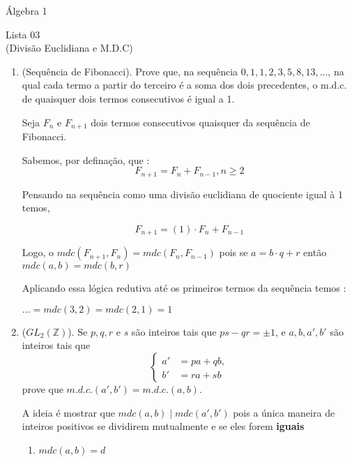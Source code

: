 \documentclass[a4paper,12pt]{article}
\begin{document}
\begin{center}
    Álgebra 1 
\end{center}

\begin{center}
    \large Lista 03 \\
    \small (Divisão Euclidiana e M.D.C)
\end{center}

\begin{enumerate}[label=3.\arabic*.]
    \item (Sequência de Fibonacci). Prove que, na sequência $0,1,1,2,3,5,8,13,...$, na qual 
    cada termo a partir do terceiro é a soma dos dois precedentes, o m.d.c. de quaisquer dois 
    termos consecutivos é igual a 1.
    
    Seja $F_{n}$ e $F_{n+1}$ dois termos consecutivos quaisquer da sequência de Fibonacci.

    Sabemos, por definação, que : 
    \[
        F_{n+1} = F_{n} + F_{n-1}, n \geq 2 
    \]

    Pensando na sequência como uma divisão euclidiana de quociente igual à 1 temos,

    \[
        F_{n+1} = (1) \cdot F_{n} + F_{n-1}
    \]    

    Logo, o $mdc(F_{n+1},F_{n}) = mdc(F_{n},F_{n-1})$ pois se $a = b \cdot q + r$ então $mdc(a,b) = mdc(b,r)$

    Aplicando essa lógica redutiva até os primeiros termos da sequência temos : 

    $ \ldots = mdc(3,2) = mdc(2,1) = 1$

    \item ($GL_2(\mathbb{Z})$). Se $p, q, r$ e $s$ são inteiros tais que $ps - qr = \pm 1$, e 
    $a, b, a', b'$ são inteiros tais que 
    \begin{equation*}
        \left\{
            \begin{aligned}
                a' &= p a + q b,\\
                b' &= r a + s b
            \end{aligned}
        \right.
    \end{equation*}
    prove que $m.d.c.(a', b') = m.d.c.(a, b)$.
    
    A ideia é mostrar que $mdc(a,b) \mid mdc(a',b') $ pois a única maneira de inteiros positivos se dividirem mutualmente e
    se eles forem \textbf{iguais}

    \begin{enumerate}[label=\Roman*.]
        \item $mdc(a,b) = d$
        

\end{enumerate}
\end{enumerate}
\end{document}
